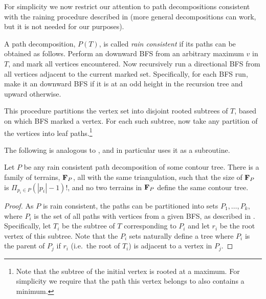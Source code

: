 {%
For simplicity we now restrict our attention to path decompositions 
consistent with the raining procedure described in  
(more general decompositions can work, but it is not needed for our purposes).

\begin{definition}
\label{def:path2} A path decomposition, $P(T)$, is called \emph{rain consistent} if its paths can be obtained as follows.
Perform an downward BFS from an arbitrary maximum $v$ in $T$, and mark all vertices encountered.  
Now recursively run a directional BFS from all vertices adjacent to the current marked set.  
Specifically, for each BFS run, make it an downward BFS if it is at an odd height in the recursion tree and upward otherwise.  

This procedure partitions the vertex set into disjoint rooted subtrees of $T$, based on which BFS marked a vertex.  
For each such subtree, now take any partition of the vertices into leaf paths.\footnote{Note that the subtree  
of the initial vertex is rooted at a maximum.  For simplicity we require that the path this vertex belongs to 
also contains a minimum.}
\end{definition}

The following is analogous to , and in particular uses it as a subroutine.

\begin{lemma}
\label{lem:pathDecomp2}
Let $P$ be any rain consistent path decomposition of some contour tree. 
There is a family of terrains, ${\bf F}_P$, all with the same triangulation, 
such that the size of ${\bf F}_P$ is $\Pi_{p_i\in P} (|p_i|-1)!$, and no two terrains in ${\bf F}_P$ define the same contour tree.
\end{lemma}
\begin{proof}
 As $P$ is rain consistent, the paths can be partitioned into sets $P_1, \dots, P_k$, where $P_i$ is the set of all paths with 
 vertices from a given BFS, as described in .  Specifically, let $T_i$ be the subtree of $T$ corresponding to $P_i$ and 
 let $r_i$ be the root vertex of this subtree.  
 Note that the $P_i$ sets naturally define a tree where $P_i$ is the parent of $P_j$ if $r_i$ (i.e.\ the root of $T_i$) is adjacent to a vertex in $P_j$.  
 

\end{proof}}
